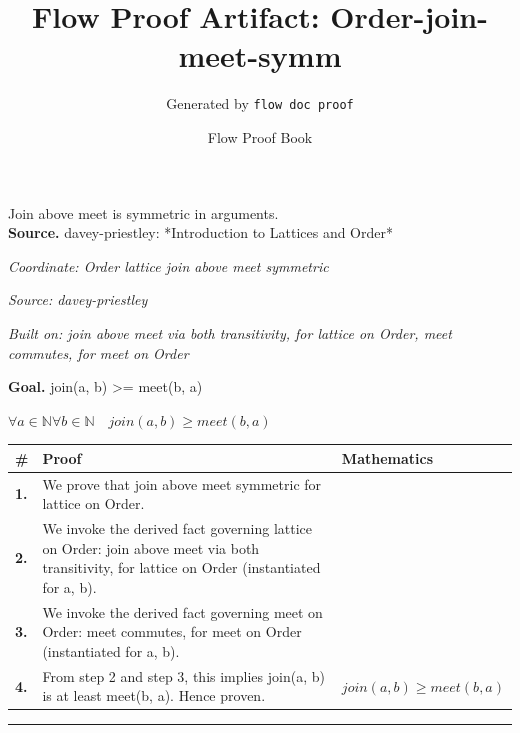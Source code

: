 \documentclass[11pt]{article}
\title{Flow Proof Artifact: Order-join-meet-symm}
\author{Generated by \texttt{flow doc proof}}
\date{Flow Proof Book}
\theoremstyle{definition}
\begin{document}
\maketitle
Join above meet is symmetric in arguments.\\[0.5em]
\textbf{Source.} davey-priestley: *Introduction to Lattices and Order*\\[0.5em]
\bigskip
{}\par
\smallskip\noindent\textit{Coordinate: Order \cdot lattice \cdot join above meet symmetric}\par
\smallskip\noindent\textit{Source: davey-priestley}\par
\smallskip\noindent\textit{Built on: join above meet via both transitivity, for lattice on Order, meet commutes, for meet on Order}\par
\medskip
\noindent\textbf{Goal.} join(a, b) >= meet(b, a)\par
\noindent$\displaystyle \forall a \in \mathbb{N} \forall b \in \mathbb{N}\quad join(a, b) \ge meet(b, a)$\par
\medskip
\noindent
\begin{tabular}{@{} >{\raggedright\arraybackslash}p{} >{\raggedright\arraybackslash}p{} >{\raggedleft\arraybackslash}p{} @{}}
\textbf{\#} & \textbf{Proof} & \textbf{Mathematics} \\
\midrule
\textbf{1.} & We prove that join above meet symmetric for lattice on Order. & \\[0.45em]
\textbf{2.} & We invoke the derived fact governing lattice on Order: join above meet via both transitivity, for lattice on Order (instantiated for a, b). & \\[0.45em]
\textbf{3.} & We invoke the derived fact governing meet on Order: meet commutes, for meet on Order (instantiated for a, b). & \\[0.45em]
\textbf{4.} & From step 2 and step 3, this implies join(a, b) is at least meet(b, a). Hence proven. & $\displaystyle join(a, b) \ge meet(b, a)$ \\[0.45em]
\bottomrule
\end{tabular}
\label{thm:Order-lattice-join_above_meet_symmetric}
\par\medskip\hrule
\end{document}
